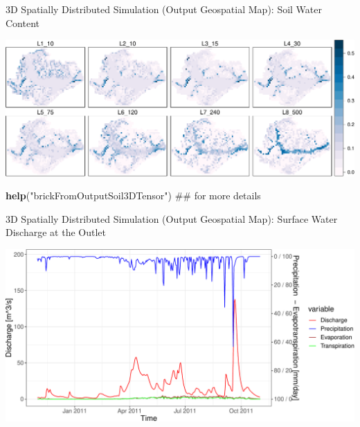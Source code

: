 \documentclass[ignorenonframetext,]{beamer}
\newenvironment{Shaded}{\begin{snugshade}}{\end{snugshade}}
\newcommand{\KeywordTok}[1]{\textcolor[rgb]{0.13,0.29,0.53}{\textbf{#1}}}
\newcommand{\StringTok}[1]{\textcolor[rgb]{0.31,0.60,0.02}{#1}}
\newcommand{\NormalTok}[1]{#1}
\begin{document}
\begin{frame}[fragile]{3D Spatially Distributed Simulation (Output
Geospatial Map): Soil Water Content}

\includegraphics{presentation_files/figure-beamer/unnamed-chunk-13-1.pdf}

\begin{Shaded}
\begin{Highlighting}[]
\KeywordTok{help}\NormalTok{(}\StringTok{"brickFromOutputSoil3DTensor"}\NormalTok{) ## for more details}
\end{Highlighting}
\end{Shaded}

\end{frame}

\begin{frame}{3D Spatially Distributed Simulation (Output Geospatial
Map): Surface Water Discharge at the Outlet}

\includegraphics{presentation_files/figure-beamer/unnamed-chunk-16-1.pdf}

\end{frame}
\end{document}

